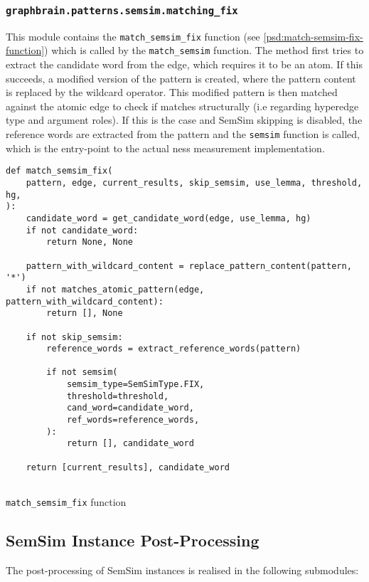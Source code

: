 \documentclass[11pt]{scrreprt}
\begin{document}
\subsubsection{\texttt{graphbrain.patterns.semsim.matching\_fix}}
\label{sec:graphbrain.patterns.semsim.matchingfix}
This module contains the \texttt{match\_semsim\_fix} function (see \cref{psd:match-semsim-fix-function}) which is called by the \texttt{match\_semsim} function.
The method first tries to extract the candidate word from the edge, which requires it to be an atom. If this succeeds, a modified version of the pattern is created, where the pattern content is replaced by the wildcard operator. This modified pattern is then matched against the atomic edge to check if matches structurally (i.e regarding hyperedge type and argument roles). If this is the case and SemSim skipping is disabled, the reference words are extracted from the pattern and the \texttt{semsim} function is called, which is the entry-point to the actual \gls{ness} measurement implementation.

\begin{pseudo}
\begin{lstlisting}
def match_semsim_fix(
    pattern, edge, current_results, skip_semsim, use_lemma, threshold, hg,
):
    candidate_word = get_candidate_word(edge, use_lemma, hg)
    if not candidate_word:
        return None, None

    pattern_with_wildcard_content = replace_pattern_content(pattern, '*')
    if not matches_atomic_pattern(edge, pattern_with_wildcard_content):
        return [], None

    if not skip_semsim:
        reference_words = extract_reference_words(pattern)

        if not semsim(
            semsim_type=SemSimType.FIX,
            threshold=threshold,
            cand_word=candidate_word,
            ref_words=reference_words,
        ):
            return [], candidate_word

    return [current_results], candidate_word
 
\end{lstlisting}
\label{psd:match-semsim-fix-function}
\caption{\texttt{match\_semsim\_fix} function}
\end{pseudo}

\subsection{SemSim Instance Post-Processing}
The post-processing of SemSim instances is realised in the following submodules:
\end{document}
